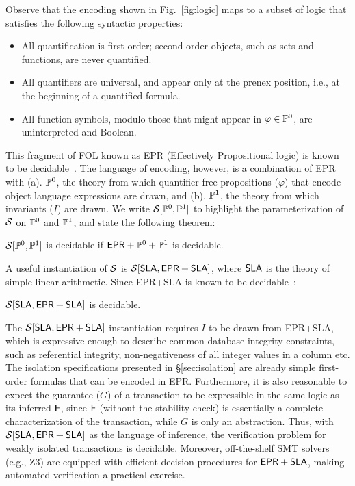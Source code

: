 Observe that the encoding shown in Fig.~\ref{fig:logic} maps to
a subset of logic that satisfies the following syntactic properties:
\begin{itemize}
  \item All quantification is first-order; second-order objects, such
    as sets and functions, are never quantified.
  \item All quantifiers are universal, and appear only at the prenex
    position, i.e., at the beginning of a quantified formula.  
  \item All function symbols, modulo those that might appear in
    $\varphi\in\mathbb{P}^0$, are uninterpreted and Boolean.
\end{itemize}
This fragment of FOL known as EPR (Effectively Propositional logic) is
known to be decidable~\cite{z3epr}. The language of encoding, however,
is a combination of {\sf EPR} with (a). $\mathbb{P}^0$, the theory from
which quantifier-free propositions ($\varphi$) that encode object
language expressions are drawn, and (b).  $\mathbb{P}^1$, the theory from
which invariants ($I$) are drawn. We write $\mathcal{S}[\mathbb{P}^0,\mathbb{P}^1]$ to
highlight the parameterization of $\mathcal{S}$ on $\mathbb{P}^0$ and $\mathbb{P}^1$,
and state the following theorem:
\begin{theorem}
  $\mathcal{S}[\mathbb{P}^0,\mathbb{P}^1]$ is decidable if ${\sf EPR}+\mathbb{P}^0+\mathbb{P}^1$
  is decidable.
\end{theorem}
A useful instantiation of $\mathcal{S}$ is $\mathcal{S}[{\sf SLA},{\sf EPR}+{\sf
SLA}]$, where ${\sf SLA}$ is the theory of simple linear arithmetic.
Since {\sf EPR}+{\sf SLA} is known to be decidable~\cite{eprsla}:
\begin{theorem}
  $\mathcal{S}[{\sf SLA},{\sf EPR}+{\sf SLA}]$ is decidable.
\end{theorem}
The $\mathcal{S}[{\sf SLA},{\sf EPR}+{\sf SLA}]$ instantiation requires $I$ to
be drawn from {\sf EPR}+{\sf SLA}, which is expressive enough to
describe common database integrity constraints, such as referential
integrity, non-negativeness of all integer values in a column etc.
The isolation specifications presented in \S\ref{sec:isolation} are
already simple first-order formulas that can be encoded in {\sf EPR}.
Furthermore, it is also reasonable to expect the guarantee ($G$) of a
transaction to be expressible in the same logic as its inferred ${\sf F}$,
since ${\sf F}$ (without the stability check) is essentially a complete
characterization of the transaction, while $G$ is only an abstraction.
Thus, with $\mathcal{S}[{\sf SLA},{\sf EPR}+{\sf SLA}]$ as the language of
inference, the verification problem for weakly isolated transactions
is decidable. Moreover, off-the-shelf SMT solvers (e.g., Z3) are
equipped with efficient decision procedures for ${\sf EPR}+{\sf SLA}$,
making automated verification a practical exercise.

